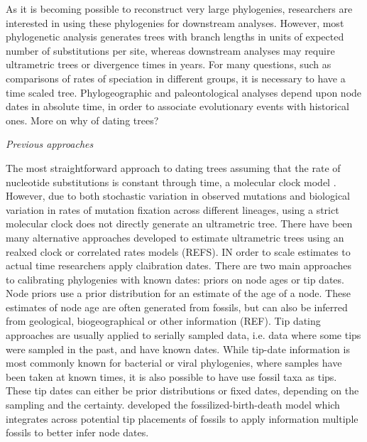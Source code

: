 \documentclass[12pt,letterpaper]{article}
\newcommand{\ejmcomment}[1]{{\color{green} #1}}
\renewcommand{\subsection}[1]{%
\bigskip
\begin{center}
\begin{large}
\normalfont\itshape #1
\end{large}
\end{center}}
\begin{document}
\vspace{1.5in}

As it is becoming possible to reconstruct very large phylogenies, 
researchers are interested in using these phylogenies for downstream analyses.
However, most phylogenetic analysis generates trees with branch lengths in units of expected number of substitutions per site,
whereas downstream analyses may require ultrametric trees or divergence times in years.
For many questions, such as comparisons of rates of speciation in different groups, it is necessary to have a time scaled tree.
Phylogeographic and paleontological analyses depend upon node dates in absolute time,
in order to associate evolutionary events with historical ones.
\ejmcomment{More on why of dating trees?}

\subsection{Previous approaches}
The most straightforward approach to dating trees assuming that the rate of nucleotide 
substitutions is constant through time, a molecular clock model \cite{zuckerkandl1962}.
However, due to both stochastic variation in observed mutations and 
biological variation in rates of mutation fixation across different lineages,
using a strict molecular clock does not directly generate an ultrametric tree.
There have been many alternative approaches developed to estimate
ultrametric trees using an realxed clock or correlated rates models (REFS).
IN order to scale estimates to actual time researchers apply claibration dates. 
There are two main approaches to calibrating phylogenies with known dates:
priors on node ages or tip dates.
Node priors use a prior distribution for an estimate of the age of a node.
These estimates of node age are often generated from fossils,
but can also be inferred from geological, biogeographical or other information (REF).
Tip dating approaches are usually applied to serially sampled data, i.e. data where some tips were sampled in the past, and have known dates.
While tip-date information is most commonly known for bacterial or viral phylogenies,
where samples have been taken at known times,
it is also possible to have use fossil taxa as tips.
These tip dates can either be prior distributions or fixed dates, depending on the sampling and the certainty.
\citet{Heath2014} developed the fossilized-birth-death model which 
integrates across potential tip placements of fossils
to apply information multiple fossils to better infer node dates.
\end{document}
